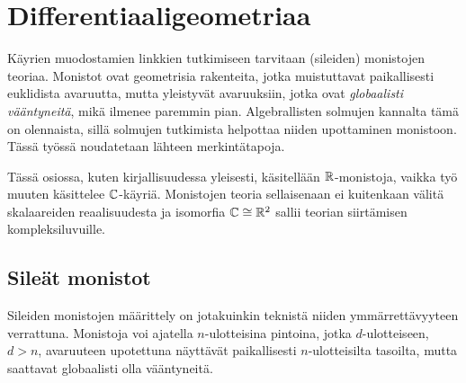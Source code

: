 \section{Differentiaaligeometriaa}
Käyrien muodostamien linkkien tutkimiseen tarvitaan (sileiden) monistojen teoriaa. Monistot ovat geometrisia rakenteita, jotka muistuttavat paikallisesti euklidista avaruutta, mutta yleistyvät avaruuksiin, jotka ovat \emph{globaalisti vääntyneitä}, mikä ilmenee paremmin pian. Algebrallisten solmujen kannalta tämä on olennaista, sillä solmujen tutkimista helpottaa niiden upottaminen monistoon. Tässä työssä noudatetaan lähteen \citep{Lee2012} merkintätapoja.
\begin{huomautus}
    Tässä osiossa, kuten kirjallisuudessa yleisesti, käsitellään $\mathbb{R}$-monistoja, vaikka työ muuten käsittelee $\mathbb{C}$-käyriä. Monistojen teoria sellaisenaan ei kuitenkaan välitä skalaareiden reaalisuudesta ja isomorfia $\mathbb{C}\cong\mathbb{R}^2$ sallii teorian siirtämisen kompleksiluvuille.
\end{huomautus}

\subsection{Sileät monistot}
Sileiden monistojen määrittely on jotakuinkin teknistä niiden ymmärrettävyyteen verrattuna. Monistoja voi ajatella $n$-ulotteisina pintoina, jotka $d$-ulotteiseen, $d>n$, avaruuteen upotettuna näyttävät paikallisesti $n$-ulotteisilta tasoilta, mutta saattavat globaalisti olla vääntyneitä.

